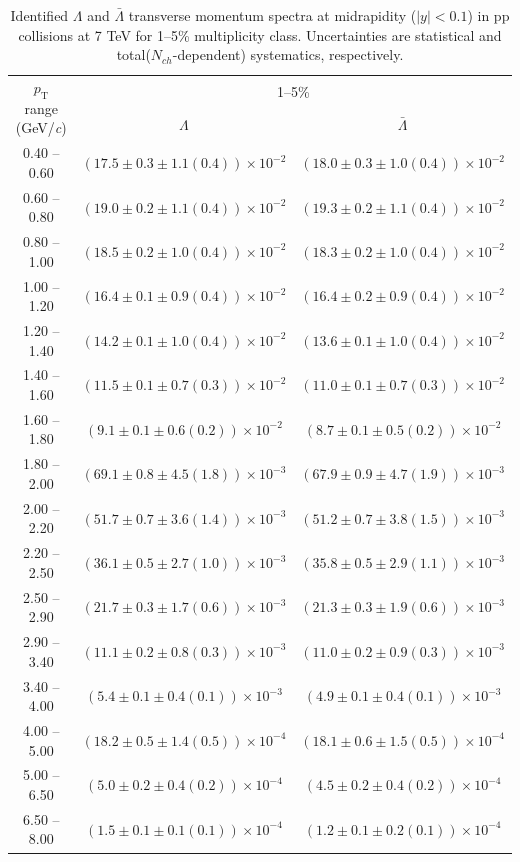 \begin{table}
\caption{Identified $\Lambda$ and $\bar{\Lambda}$  transverse momentum spectra at midrapidity ($|y|<0.1$) in pp collisions at 7 TeV for 1--5\% multiplicity class. Uncertainties are statistical and total($N_{ch}$-dependent) systematics, respectively.}
\label{tab:Lambda_AntiLambda_1to5}
\begin{center}
\begin{tabular}{ c | c c }
\hline
\multirow{2}{*}{$p_{\mathrm{T}}$ range (GeV/\textit{c})} & \multicolumn{2}{c}{1--5\%} \\ & $\Lambda$& $\bar{\Lambda}$\\ 
\hline
0.40 -- 0.60 & $(17.5\pm0.3\pm1.1(0.4))\times10^{-2}$ & $(18.0\pm0.3\pm1.0(0.4))\times10^{-2}$ \\ 
0.60 -- 0.80 & $(19.0\pm0.2\pm1.1(0.4))\times10^{-2}$ & $(19.3\pm0.2\pm1.1(0.4))\times10^{-2}$ \\ 
0.80 -- 1.00 & $(18.5\pm0.2\pm1.0(0.4))\times10^{-2}$ & $(18.3\pm0.2\pm1.0(0.4))\times10^{-2}$ \\ 
1.00 -- 1.20 & $(16.4\pm0.1\pm0.9(0.4))\times10^{-2}$ & $(16.4\pm0.2\pm0.9(0.4))\times10^{-2}$ \\ 
1.20 -- 1.40 & $(14.2\pm0.1\pm1.0(0.4))\times10^{-2}$ & $(13.6\pm0.1\pm1.0(0.4))\times10^{-2}$ \\ 
1.40 -- 1.60 & $(11.5\pm0.1\pm0.7(0.3))\times10^{-2}$ & $(11.0\pm0.1\pm0.7(0.3))\times10^{-2}$ \\ 
1.60 -- 1.80 & $(9.1\pm0.1\pm0.6(0.2))\times10^{-2}$ & $(8.7\pm0.1\pm0.5(0.2))\times10^{-2}$ \\ 
1.80 -- 2.00 & $(69.1\pm0.8\pm4.5(1.8))\times10^{-3}$ & $(67.9\pm0.9\pm4.7(1.9))\times10^{-3}$ \\ 
2.00 -- 2.20 & $(51.7\pm0.7\pm3.6(1.4))\times10^{-3}$ & $(51.2\pm0.7\pm3.8(1.5))\times10^{-3}$ \\ 
2.20 -- 2.50 & $(36.1\pm0.5\pm2.7(1.0))\times10^{-3}$ & $(35.8\pm0.5\pm2.9(1.1))\times10^{-3}$ \\ 
2.50 -- 2.90 & $(21.7\pm0.3\pm1.7(0.6))\times10^{-3}$ & $(21.3\pm0.3\pm1.9(0.6))\times10^{-3}$ \\ 
2.90 -- 3.40 & $(11.1\pm0.2\pm0.8(0.3))\times10^{-3}$ & $(11.0\pm0.2\pm0.9(0.3))\times10^{-3}$ \\ 
3.40 -- 4.00 & $(5.4\pm0.1\pm0.4(0.1))\times10^{-3}$ & $(4.9\pm0.1\pm0.4(0.1))\times10^{-3}$ \\ 
4.00 -- 5.00 & $(18.2\pm0.5\pm1.4(0.5))\times10^{-4}$ & $(18.1\pm0.6\pm1.5(0.5))\times10^{-4}$ \\ 
5.00 -- 6.50 & $(5.0\pm0.2\pm0.4(0.2))\times10^{-4}$ & $(4.5\pm0.2\pm0.4(0.2))\times10^{-4}$ \\ 
6.50 -- 8.00 & $(1.5\pm0.1\pm0.1(0.1))\times10^{-4}$ & $(1.2\pm0.1\pm0.2(0.1))\times10^{-4}$ \\ 
\hline
\end{tabular}
\end{center}
\end{table}
 
